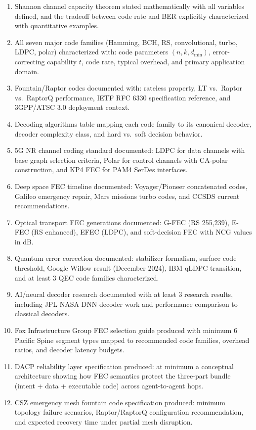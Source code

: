 \documentclass[11pt,letterpaper]{article}
\begin{document}
\begin{enumerate}[leftmargin=*, label=\textbf{SC-\arabic*:}]
  \item Shannon channel capacity theorem stated mathematically with all variables defined, and the tradeoff between code rate and BER explicitly characterized with quantitative examples.
  \item All seven major code families (Hamming, BCH, RS, convolutional, turbo, LDPC, polar) characterized with: code parameters $(n, k, d_{\min})$, error-correcting capability $t$, code rate, typical overhead, and primary application domain.
  \item Fountain/Raptor codes documented with: rateless property, LT vs.\ Raptor vs.\ RaptorQ performance, IETF RFC 6330 specification reference, and 3GPP/ATSC 3.0 deployment context.
  \item Decoding algorithms table mapping each code family to its canonical decoder, decoder complexity class, and hard vs.\ soft decision behavior.
  \item 5G NR channel coding standard documented: LDPC for data channels with base graph selection criteria, Polar for control channels with CA-polar construction, and KP4 FEC for PAM4 SerDes interfaces.
  \item Deep space FEC timeline documented: Voyager/Pioneer concatenated codes, Galileo emergency repair, Mars missions turbo codes, and CCSDS current recommendations.
  \item Optical transport FEC generations documented: G-FEC (RS 255,239), E-FEC (RS enhanced), EFEC (LDPC), and soft-decision FEC with NCG values in dB.
  \item Quantum error correction documented: stabilizer formalism, surface code threshold, Google Willow result (December 2024), IBM qLDPC transition, and at least 3 QEC code families characterized.
  \item AI/neural decoder research documented with at least 3 research results, including JPL NASA DNN decoder work and performance comparison to classical decoders.
  \item Fox Infrastructure Group FEC selection guide produced with minimum 6 Pacific Spine segment types mapped to recommended code families, overhead ratios, and decoder latency budgets.
  \item DACP reliability layer specification produced: at minimum a conceptual architecture showing how FEC semantics protect the three-part bundle (intent + data + executable code) across agent-to-agent hops.
  \item CSZ emergency mesh fountain code specification produced: minimum topology failure scenarios, Raptor/RaptorQ configuration recommendation, and expected recovery time under partial mesh disruption.
\end{enumerate}
\end{document}
